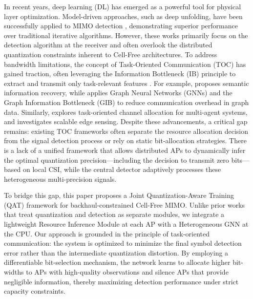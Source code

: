 In recent years, deep learning (DL) has emerged as a powerful tool for physical layer optimization. Model-driven approaches, such as deep unfolding, have been successfully applied to MIMO detection \cite{He2020ModelDriven, Wei2020LearnedCG, Sun2020LearningTS}, demonstrating superior performance over traditional iterative algorithms. However, these works primarily focus on the detection algorithm at the receiver and often overlook the distributed quantization constraints inherent to Cell-Free architectures. To address bandwidth limitations, the concept of Task-Oriented Communication (TOC) has gained traction, often leveraging the Information Bottleneck (IB) principle to extract and transmit only task-relevant features \cite{Shao2021TaskOrientedCF, Shao2021TaskOriented}. For example, \cite{Beck2023SemanticIR} proposes semantic information recovery, while \cite{Li2024TaskOriented} applies Graph Neural Networks (GNNs) and the Graph Information Bottleneck (GIB) to reduce communication overhead in graph data. Similarly, \cite{He2022LearningTO} explores task-oriented channel allocation for multi-agent systems, and \cite{Hou2025Scalable} investigates scalable edge sensing. Despite these advancements, a critical gap remains: existing TOC frameworks often separate the resource allocation decision from the signal detection process or rely on static bit-allocation strategies. There is a lack of a unified framework that allows distributed APs to dynamically infer the optimal quantization precision---including the decision to transmit zero bits---based on local CSI, while the central detector adaptively processes these heterogeneous multi-precision signals.

To bridge this gap, this paper proposes a Joint Quantization-Aware Training (QAT) framework for backhaul-constrained Cell-Free MIMO. Unlike prior works that treat quantization and detection as separate modules, we integrate a lightweight Resource Inference Module at each AP with a Heterogeneous GNN at the CPU. Our approach is grounded in the principle of task-oriented communication: the system is optimized to minimize the final symbol detection error rather than the intermediate quantization distortion. By employing a differentiable bit-selection mechanism, the network learns to allocate higher bit-widths to APs with high-quality observations and silence APs that provide negligible information, thereby maximizing detection performance under strict capacity constraints.

